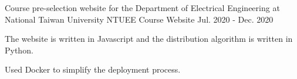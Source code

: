 \begin{cventries}
  \cventry
  {Course pre-selection website for the Department of Electrical Engineering at National Taiwan University}
  {NTUEE Course Website \href{https://github.com/NTUEEInfoDep/NTUEECourseWebsite2020}{\color{red}{[GitHub Link]}}}
  {}
  {Jul. 2020 - Dec. 2020} %
  {
    \begin{cvitems} %
      \item {The website is written in Javascript and the distribution algorithm is written in Python.}
      \item {Used Docker to simplify the deployment process.}
    \end{cvitems}
  }

\end{cventries}
